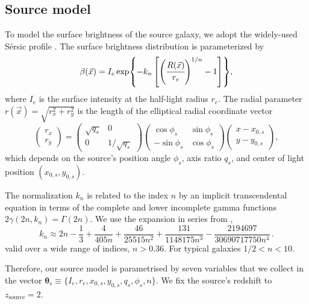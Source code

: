 \subsection{Source model} \label{subsec:source}
To model the surface brightness of the source galaxy, we adopt the widely-used Sérsic profile \citep{Sersic:1963aa}. The surface brightness distribution is parameterized by 
\begin{equation}\label{eq:sersic}
    \beta(\vec{x})=I_e \exp{-k_n\left[\left(\cfrac{R(\vec{x})}{r_e}\right)^{1/n}-1\right]},
\end{equation}
where $I_e$ is the surface intensity at the half-light radius $r_e$. The radial parameter $r(\vec{x})=\sqrt{r_x^2+r_y^2}$ is the length of the elliptical radial coordinate vector
\begin{equation}
    \begin{pmatrix} 
        r_x \\ r_y 
    \end{pmatrix} = 
    \begin{pmatrix} 
      \sqrt{q_s} & 0 \\ 0 & 1/\sqrt{q_s} 
    \end{pmatrix} 
    \begin{pmatrix} 
        \cos\phi_s & \sin\phi_s \\ -\sin\phi_s & \cos\phi_s 
    \end{pmatrix} 
    \begin{pmatrix} 
        x - x_{0,s} \\ y - y_{0,s} 
    \end{pmatrix},
\end{equation}
which depends on the source's position angle $\phi_s$, axis ratio $q_s$, and center of light position $(x_{0,s}, y_{0,s})$. 

The normalization $k_n$ is related to the index $n$ by an implicit transcendental equation in terms of the complete and lower incomplete gamma functions $2\gamma(2n, k_n)=\Gamma(2n)$. We use the expansion in series from \cite{Ciotti:1999zs}, 
\begin{equation}
    k_n \approx 2 n - \frac{1}{3} + \frac{4}{405 n} + \frac{46}{25515 n^2} + \frac{131}{1148175 n^3} - \frac{2194697}{30690717750 n^4} \, .
\end{equation}
valid over a wide range of indices, $n>0.36$. For typical galaxies $1/2 < n < 10$.

Therefore, our source model is parametrised by seven variables that we collect in the vector $\bm \theta_s\equiv\{I_e, r_e, x_{0,s}, y_{0,s}, q_s, \phi_s, n\}$. We fix the source's redshift to $z_\mathrm{source} = 2$.

